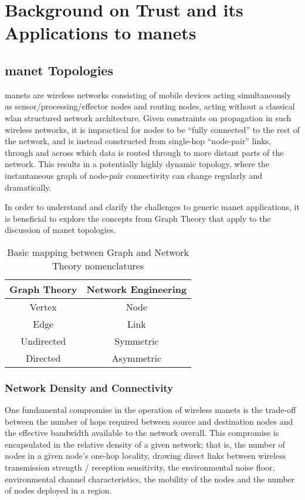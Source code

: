\chapter{Background on Trust and its Applications to \glspl{manet}}
\label{ch:trust_background}

\section{\acrlong{manet} Topologies}


\glspl{manet} are wireless networks consisting of mobile devices acting simultaneously as sensor/processing/effector nodes and routing nodes, acting without a classical \gls{wlan} structured network architecture. 
Given constraints on propagation in such wireless networks, it is impractical for nodes to be ``fully connected'' to the rest of the network, and is instead constructed from single-hop ``node-pair'' links, through and across which data is routed through to more distant parts of the network.
This results in a potentially highly dynamic topology, where the instantaneous graph of node-pair connectivity can change regularly and dramatically. 

In order to understand and clarify the challenges to generic \gls{manet} applications, it is beneficial to explore the concepts from Graph Theory that apply to the discussion of \gls{manet} topologies. 


\begin{table} 
	\centering
	\begin{tabular}{cc}
		\toprule
		Graph Theory & Network Engineering\\
		\midrule
		Vertex & Node\\
		Edge & Link\\
		Undirected & Symmetric\\
		Directed & Asymmetric\\
		\bottomrule
	\end{tabular}
	\caption{Basic mapping between Graph and Network Theory nomenclatures}
\end{table}

\subsection{Network Density and Connectivity}

One fundamental compromise in the operation of wireless \glspl{manet} is the trade-off between the number of hops required between source and destination nodes and the effective bandwidth available to the network overall\cite{Royer2001}.
This compromise is encapsulated in the relative density of a given network; that is, the number of nodes in a given node's one-hop locality, drawing direct links between wireless transmission strength / reception sensitivity, the environmental noise floor, environmental channel characteristics, the mobility of the nodes and the number of nodes deployed in a region.

